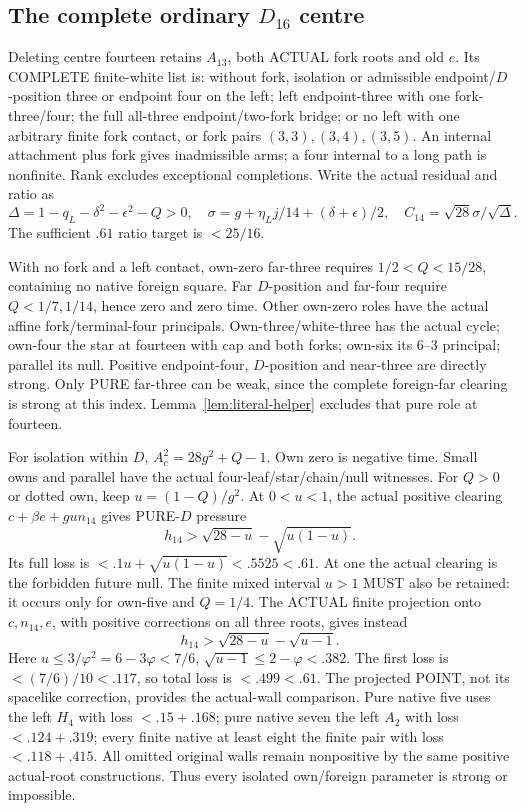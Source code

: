 \documentclass[11pt]{article}
\begin{document}
\subsection{The complete ordinary \(D_{16}\) centre}
\label{app:arithD16ordinarycentre}

Deleting centre fourteen retains \(A_{13}\),
both ACTUAL fork roots and old \(e\).
Its COMPLETE finite-white list is:
without fork, isolation or admissible
endpoint/\(D\)-position three or endpoint
four on the left;
left endpoint-three with one fork-three/four;
the full all-three endpoint/two-fork bridge;
or no left with one arbitrary finite fork
contact, or fork pairs
\((3,3),(3,4),(3,5)\).
An internal attachment plus fork gives
inadmissible arms; a four internal to
a long path is nonfinite.
Rank excludes exceptional completions.
Write the actual residual and ratio as
\[
 \Delta=1-q_L-\delta^2-\epsilon^2-Q>0,\quad
 \sigma=g+\eta_Lj/14+(\delta+\epsilon)/2,\quad
                              C_{14}=\sqrt{28}\sigma/\sqrt\Delta .
\]
The sufficient \(.61\) ratio target is
\(<25/16\).

With no fork and a left contact,
own-zero far-three requires
\(1/2<Q<15/28\), containing no native
foreign square.
Far \(D\)-position and far-four require
\(Q<1/7,1/14\), hence zero and zero
time.  Other own-zero roles have
the actual affine fork/terminal-four
principals.
Own-three/white-three has the actual
cycle; own-four the star at fourteen
with cap and both forks; own-six its
\(6\)--\(3\) principal; parallel its null.
Positive endpoint-four, \(D\)-position
and near-three are directly strong.
Only PURE far-three can be weak, since
the complete foreign-far clearing is
strong at this index.
Lemma~\ref{lem:literal-helper} excludes
that pure role at fourteen.

For isolation within \(D\),
\(A_c^2=28g^2+Q-1\).
Own zero is negative time.
Small owns and parallel have the actual
four-leaf/star/chain/null witnesses.
For \(Q>0\) or dotted own, keep
\(u=(1-Q)/g^2\).
At \(0<u<1\), the actual positive
clearing \(c+\beta e+gu n_{14}\)
gives PURE-\(D\) pressure
\[
             h_{14}>\sqrt{28-u}-\sqrt{u(1-u)} .
\]
Its full loss is \(<.1u+\sqrt{u(1-u)}
<.5525<.61\).
At one the actual clearing is the
forbidden future null.
The finite mixed interval \(u>1\)
MUST also be retained:
it occurs only for own-five and
\(Q=1/4\).
The ACTUAL finite projection onto
\(c,n_{14},e\), with positive corrections
on all three roots, gives instead
\[
                      h_{14}>\sqrt{28-u}-\sqrt{u-1}.
\]
Here \(u\le3/\varphi^2=6-3\varphi<7/6\),
\(\sqrt{u-1}\le2-\varphi<.382\).
The first loss is \(<(7/6)/10<.117\),
so total loss is \(<.499<.61\).
The projected POINT, not its spacelike
correction, provides the actual-wall
comparison.
Pure native five uses the left \(H_4\)
with loss \(<.15+.168\);
pure native seven the left \(A_2\)
with loss \(<.124+.319\);
every finite native at least eight
the finite pair with loss \(<.118+.415\).
All omitted original walls remain
nonpositive by the same positive
actual-root constructions.
Thus every isolated own/foreign parameter
is strong or impossible.
\end{document}
